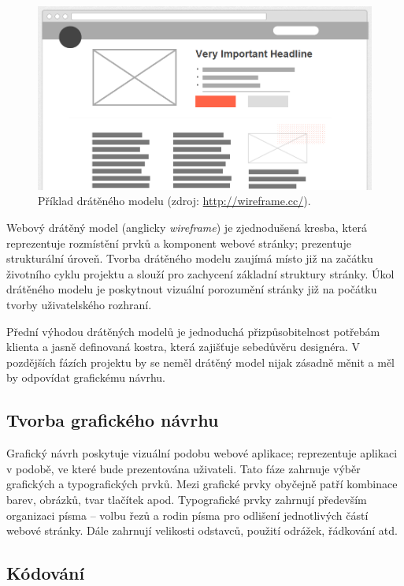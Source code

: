 \begin{figure}[htbp]
    \centering
    \includegraphics[width=\textwidth]{images/wireframe-example.png}
    \caption{Příklad drátěného modelu (zdroj: \url{http://wireframe.cc/}).}
\end{figure}

Webový drátěný model (anglicky \textit{wireframe}) je zjednodušená kresba, která reprezentuje rozmístění prvků a komponent webové stránky; prezentuje strukturální úroveň. Tvorba drátěného modelu zaujímá místo již na začátku životního cyklu projektu a slouží pro zachycení základní struktury stránky. Úkol drátěného modelu je poskytnout vizuální porozumění stránky již na počátku tvorby uživatelského rozhraní.

Přední výhodou drátěných modelů je jednoduchá přizpůsobitelnost potřebám klienta a jasně definovaná kostra, která zajišťuje sebedůvěru designéra. V pozdějších fázích projektu by se neměl drátěný model nijak zásadně měnit a měl by odpovídat grafickému návrhu.

\subsection{Tvorba grafického návrhu}
\label{sec:designing}

Grafický návrh poskytuje vizuální podobu webové aplikace; reprezentuje aplikaci v podobě, ve které bude prezentována uživateli. Tato fáze zahrnuje výběr grafických a typografických prvků. Mezi grafické prvky obyčejně patří kombinace barev, obrázků, tvar tlačítek apod. Typografické prvky zahrnují především organizaci písma -- volbu řezů a rodin písma pro odlišení jednotlivých částí webové stránky. Dále zahrnují velikosti odstavců, použití odrážek, řádkování atd.

\subsection{Kódování}
\label{sec:coding}

